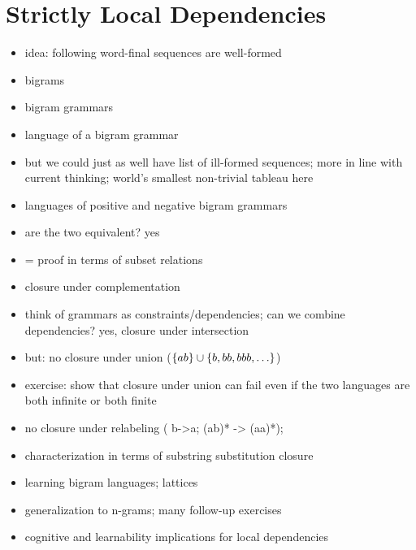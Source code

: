 \chapter{Strictly Local Dependencies}
\label{cha:SL}

\begin{itemize}
    \item idea: following word-final sequences are well-formed
    \item bigrams
    \item bigram grammars
    \item language of a bigram grammar
    \item but we could just as well have list of ill-formed sequences; more in line with current thinking; world's smallest non-trivial tableau here
    \item languages of positive and negative bigram grammars
    \item are the two equivalent? yes
    \item = proof in terms of subset relations
    \item closure under complementation
    \item think of grammars as constraints/dependencies; can we combine dependencies? yes, closure under intersection
    \item but: no closure under union ($\left \{ ab \right \} \cup \left \{ b, bb, bbb, \ldots \right \}$)
    \item exercise: show that closure under union can fail even if the two languages are both infinite or both finite
    \item no closure under relabeling ( b->a; (ab)* -> (aa)*);
    \item characterization in terms of substring substitution closure
    \item learning bigram languages; lattices
    \item generalization to n-grams; many follow-up exercises
    \item cognitive and learnability implications for local dependencies
\end{itemize}

